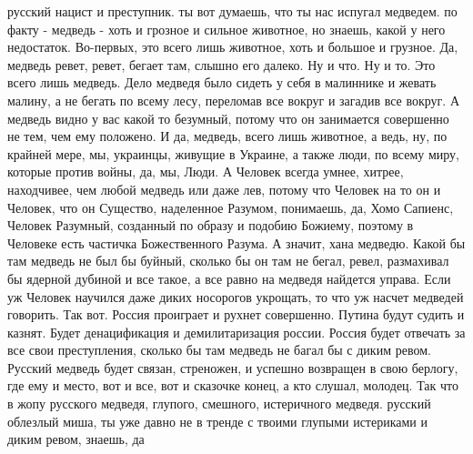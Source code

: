  
 
 
 
 

русский нацист и преступник. ты вот думаешь, что ты нас испугал медведем. по
факту - медведь - хоть и грозное и сильное животное, но знаешь, какой у него
недостаток. Во-первых, это всего лишь животное, хоть и большое и грузное. Да,
медведь ревет, ревет, бегает там, слышно его далеко. Ну и что. Ну и то. Это
всего лишь медведь. Дело медведя было сидеть у себя в малиннике и жевать
малину, а не бегать по всему лесу, переломав все вокруг и загадив все вокруг. А
медведь видно у вас какой то безумный, потому что он занимается совершенно не
тем, чем ему положено. И да, медведь, всего лишь животное, а ведь, ну, по
крайней мере, мы, украинцы, живущие в Украине, а также люди, по всему миру,
которые против войны, да, мы, Люди. А Человек всегда умнее, хитрее, находчивее,
чем любой медведь или даже лев, потому что Человек на то он и Человек, что он
Существо, наделенное Разумом, понимаешь, да, Хомо Сапиенс, Человек Разумный,
созданный по образу и подобию Божиему, поэтому в Человеке есть частичка
Божественного Разума. А значит, хана медведю. Какой бы там медведь не был бы
буйный, сколько бы он там не бегал, ревел, размахивал бы ядерной дубиной и все
такое, а все равно на медведя найдется управа. Если уж Человек научился даже
диких носорогов укрощать, то что уж насчет медведей говорить. Так вот. Россия
проиграет и рухнет совершенно. Путина будут судить и казнят. Будет
денацификация и демилитаризация россии. Россия будет отвечать за все свои
преступления, сколько бы там медведь не багал бы с диким ревом. Русский медведь
будет связан, стреножен, и успешно возвращен в свою берлогу, где ему и место,
вот и все, вот и сказочке конец, а кто слушал, молодец. Так что в жопу русского
медведя, глупого, смешного, истеричного медведя. русский облезлый миша, ты уже
давно не в тренде с твоими глупыми истериками и диким ревом, знаешь, да
